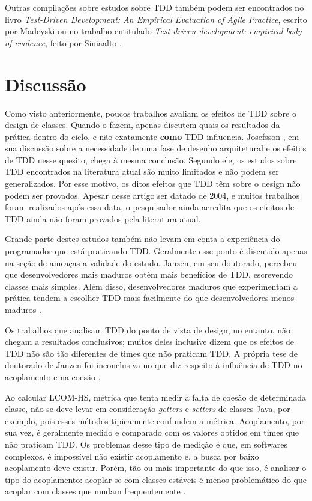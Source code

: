 Outras compilações sobre estudos sobre TDD também podem ser encontrados no livro
\textit{Test-Driven Development: An Empirical Evaluation of Agile Practice},
escrito por Madeyski \cite{madeyski-livro} ou no trabalho entitulado
\textit{Test driven development: empirical body of evidence}, feito por
Siniaalto \cite{tdd-body-of-evidence}.

\section{Discussão}

Como visto anteriormente, poucos trabalhos avaliam os efeitos de TDD sobre o
design de classes. Quando o fazem, apenas discutem quais os resultados da prática
dentro do ciclo, e não exatamente \textbf{como} TDD influencia. Josefsson
\cite{josefsson}, em sua discussão sobre a necessidade de uma fase de desenho
arquitetural e os efeitos de TDD nesse quesito, chega à mesma conclusão. Segundo
ele, os estudos sobre TDD encontrados na literatura atual são muito limitados e
não podem ser generalizados. Por esse motivo, os ditos efeitos que TDD têm 
sobre o design não podem ser provados. Apesar desse artigo ser datado de 2004, e
muitos trabalhos foram realizados após essa data, o pesquisador ainda acredita 
que os efeitos de TDD ainda não foram provados pela literatura atual.

Grande parte destes estudos também não levam em conta a experiência do
programador que está praticando TDD. Geralmente esse ponto é discutido apenas 
na seção de ameaças a validade do estudo. Janzen, em seu doutorado, percebeu que
desenvolvedores mais maduros obtêm mais benefícios de TDD, escrevendo classes
mais simples. Além disso, desenvolvedores maduros que experimentam a prática
tendem a escolher TDD mais facilmente do que desenvolvedores menos maduros
\cite{janzen-phd}.

Os trabalhos que analisam TDD do ponto de vista de design, no entanto, não
chegam a resultados conclusivos; muitos deles inclusive dizem que os efeitos
de TDD não são tão diferentes de times que não praticam TDD.  A própria tese de
doutorado de Janzen foi inconclusiva no que diz respeito à influência de TDD no 
acoplamento e na coesão \cite{janzen-phd}. 

Ao calcular LCOM-HS, métrica que tenta medir a falta de coesão de determinada
classe, não se deve levar em consideração \textit{getters} e \textit{setters} de
classes Java, por exemplo, pois esses métodos tipicamente confundem a métrica.
Acoplamento, por sua vez, é geralmente medido e comparado com os valores
obtidos em times que não praticam TDD. Os problemas desse tipo de medição é que,
em softwares complexos, é impossível não existir acoplamento e, a busca por
baixo acoplamento deve existir. Porém, tão ou mais importante do que isso, é
analisar o tipo do acoplamento: acoplar-se com classes estáveis é menos
problemático do que acoplar com classes que mudam frequentemente
\cite{bob-martin}. 

